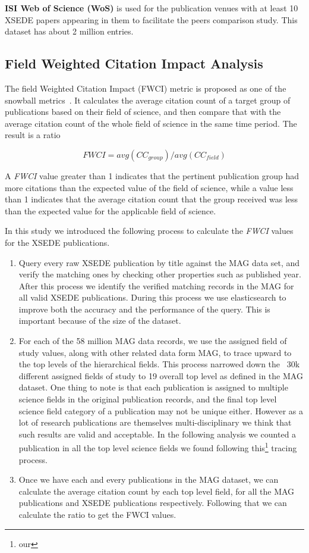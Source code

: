 \documentclass{sig-alternate}
\begin{document}
\parindent 0pt \textbf{ISI Web of Science (WoS)} is used for the publication
venues with at least 10 XSEDE papers appearing in them to facilitate
the peers comparison study. This dataset has about 2 million entries.

\subsection{Field Weighted Citation Impact Analysis}

The field Weighted Citation Impact (FWCI) metric is proposed as one of
the snowball metrics~\cite{colledge2014snowball}. It calculates the
average citation count of a target group of publications based on
their field of science, and then compare that with the average
citation count of the whole field of science in the same time
period. The result is a ratio

\[ FWCI = avg(CC_{group})/avg(CC_{field}) \]

A \emph{FWCI} value greater than 1 indicates that the pertinent
publication group had more citations than the expected value of the
field of science, while a value less than 1 indicates that the average
citation count that the group received was less than the expected
value for the applicable field of science.

In this study we introduced the following process to calculate the \emph{FWCI}
values for the XSEDE publications.

\begin{enumerate}
\item Query every raw XSEDE publication by title against the MAG data
  set, and verify the matching ones by checking other properties such
  as published year. After this process we identify the verified
  matching records in the MAG for all valid XSEDE publications.
  During this process we use elasticsearch
  \cite{gormley2015elasticsearch} to improve both the accuracy and the
  performance of the query.  This is important because of the size of
  the dataset.
\item For each of the 58 million MAG data records, we use the assigned
  field of study values, along with other related data form MAG, to
  trace upward to the top levels of the hierarchical fields. This
  process narrowed down the ~30k different assigned fields of study to
  19 overall top level  as defined in the MAG
  dataset.  One thing to note is that each publication is assigned
  to multiple science fields in the original publication records, and
  the final top level science field category of a publication may not
  be unique either. However as a lot of research publications are
  themselves multi-disciplinary we think that such results are valid
  and acceptable. In the following analysis we counted a publication
  in all the top level science fields we found following this\footnote{our} tracing
  process.
\item Once we have each and every publications in the MAG dataset, we
  can calculate the average citation count by each top level field,
  for all the MAG publications and XSEDE publications
  respectively. Following that we can calculate the ratio to get the
  FWCI values.
\end{enumerate}
\end{document}
